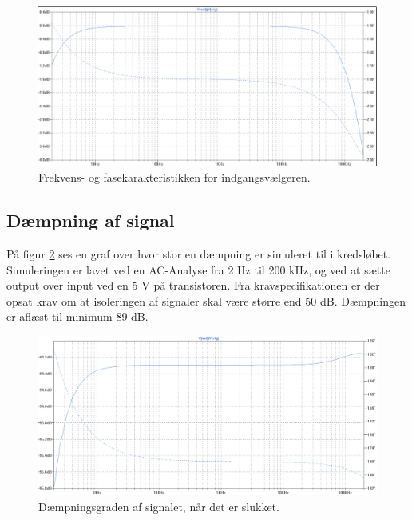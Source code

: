 \begin{figure}[h]
\centering
\includegraphics[scale=0.3]{teknisk/indgangsvaelger/simulering/frekvenskarakteristik.png}
\caption{Frekvens- og fasekarakteristikken for indgangsvælgeren.}
\label{indgangsvaelger_frekvenskarakteristik}
\end{figure}

\subsection*{Dæmpning af signal}
På figur \ref{indgangsvaelger_daempniing} ses en graf over hvor stor en dæmpning er simuleret til i kredsløbet. Simuleringen er lavet ved en AC-Analyse fra 2 Hz til 200 kHz, og ved at sætte output over input ved en 5 V på transistoren. Fra kravspecifikationen er der opsat krav om at isoleringen af signaler skal være større end 50 dB. Dæmpningen er aflæst til minimum 89 dB.
\begin{figure}[h]
\centering
\includegraphics[scale=0.3]{teknisk/indgangsvaelger/simulering/daempning_af_signal.png}
\caption{Dæmpningsgraden af signalet, når det er slukket.}
\label{indgangsvaelger_daempniing}
\end{figure}

